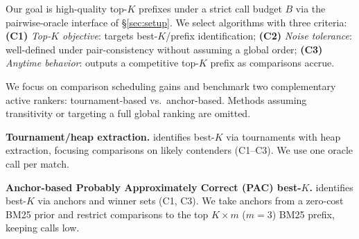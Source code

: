 \documentclass{llmxive}
\begin{document}
Our goal is high-quality top-$K$ prefixes under a strict call budget $B$ via the pairwise-oracle interface of \S\ref{sec:setup}.
We select algorithms with three criteria:
\textbf{(C1)} \emph{Top-$K$ objective}: targets best-$K$/prefix identification;
\textbf{(C2)} \emph{Noise tolerance}: well-defined under pair-consistency without assuming a global order;
\textbf{(C3)} \emph{Anytime behavior}: outputs a competitive top-$K$ prefix as comparisons accrue.

We focus on comparison scheduling gains and benchmark two complementary active rankers: tournament-based vs.\ anchor-based. Methods assuming transitivity or targeting a full global ranking are omitted.

\noindent\textbf{Tournament/heap extraction.}
\citet{mohajer2017active} identifies best-$K$ via tournaments with heap extraction, focusing comparisons on likely contenders (C1--C3). We use one oracle call per match.

\noindent\textbf{Anchor-based Probably Approximately Correct (PAC) best-$K$.}
\citet{agarwal2022pac} identifies best-$K$ via anchors and winner sets (C1, C3).
We take anchors from a zero-cost BM25 prior and restrict comparisons to the top $K{\times}m$ ($m{=}3$) BM25 prefix, keeping calls low.
\end{document}
